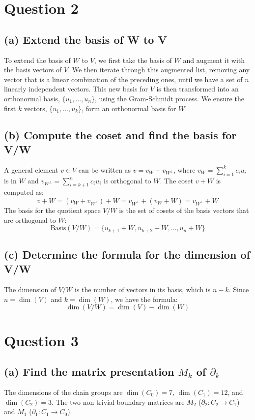 \documentclass{article}
\begin{document}
\section*{Question 2}
\subsection*{(a) Extend the basis of W to V}
To extend the basis of $W$ to $V$, we first take the basis of $W$ and augment it with the basis vectors of $V$. We then iterate through this augmented list, removing any vector that is a linear combination of the preceding ones, until we have a set of $n$ linearly independent vectors. This new basis for $V$ is then transformed into an orthonormal basis, $\{u_1, \dots, u_n\}$, using the Gram-Schmidt process. We ensure the first $k$ vectors, $\{u_1, \dots, u_k\}$, form an orthonormal basis for $W$.

\subsection*{(b) Compute the coset and find the basis for V/W}
A general element $v \in V$ can be written as $v = v_W + v_{W^\perp}$, where $v_W = \sum_{i=1}^{k} c_i u_i$ is in $W$ and $v_{W^\perp} = \sum_{i=k+1}^{n} c_i u_i$ is orthogonal to $W$.
The coset $v+W$ is computed as:
$$ v + W = (v_W + v_{W^\perp}) + W = v_{W^\perp} + (v_W + W) = v_{W^\perp} + W $$
The basis for the quotient space $V/W$ is the set of cosets of the basis vectors that are orthogonal to $W$:
$$ \text{Basis}(V/W) = \{ u_{k+1} + W, u_{k+2} + W, \dots, u_n + W \} $$

\subsection*{(c) Determine the formula for the dimension of V/W}
The dimension of $V/W$ is the number of vectors in its basis, which is $n-k$. Since $n=\dim(V)$ and $k=\dim(W)$, we have the formula:
$$ \dim(V/W) = \dim(V) - \dim(W) $$

\section*{Question 3}
\subsection*{(a) Find the matrix presentation $M_k$ of $\partial_k$}
The dimensions of the chain groups are $\dim(C_0)=7$, $\dim(C_1)=12$, and $\dim(C_2)=3$. The two non-trivial boundary matrices are $M_2$ ($\partial_2: C_2 \to C_1$) and $M_1$ ($\partial_1: C_1 \to C_0$).
\end{document}
